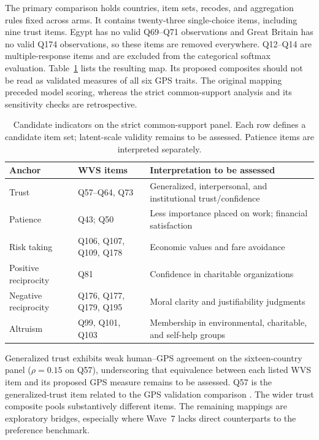 The primary comparison holds countries, item sets, recodes, and aggregation rules fixed across arms. It contains twenty-three single-choice items, including nine trust items. Egypt has no valid Q69--Q71 observations and Great Britain has no valid Q174 observations, so these items are removed everywhere. Q12--Q14 are multiple-response items and are excluded from the categorical softmax evaluation. Table~\ref{tab:map} lists the resulting map. Its proposed composites should not be read as validated measures of all six GPS traits. The original mapping preceded model scoring, whereas the strict common-support analysis and its sensitivity checks are retrospective.

\begin{table}[htbp]\centering\small
\caption{Candidate indicators on the strict common-support panel. Each row defines a candidate item set; latent-scale validity remains to be assessed. Patience items are interpreted separately.}\label{tab:map}
\begin{tabularx}{\linewidth}{@{}>{\raggedright\arraybackslash}p{30mm}>{\raggedright\arraybackslash}p{35mm}>{\raggedright\arraybackslash}X@{}}\toprule
Anchor & WVS items & Interpretation to be assessed\\\midrule
Trust & Q57--Q64, Q73 & Generalized, interpersonal, and institutional trust/confidence\\
Patience & Q43; Q50 & Less importance placed on work; financial satisfaction\\
Risk taking & Q106, Q107, Q109, Q178 & Economic values and fare avoidance\\
Positive reciprocity & Q81 & Confidence in charitable organizations\\
Negative reciprocity & Q176, Q177, Q179, Q195 & Moral clarity and justifiability judgments\\
Altruism & Q99, Q101, Q103 & Membership in environmental, charitable, and self-help groups\\\bottomrule
\end{tabularx}\end{table}

Generalized trust exhibits weak human--GPS agreement on the sixteen-country panel ($\rho = 0.15$ on Q57), underscoring that equivalence between each listed WVS item and its proposed GPS measure remains to be assessed. Q57 is the generalized-trust item related to the GPS validation comparison \cite{falk2018}. The wider trust composite pools substantively different items. The remaining mappings are exploratory bridges, especially where Wave~7 lacks direct counterparts to the preference benchmark.

